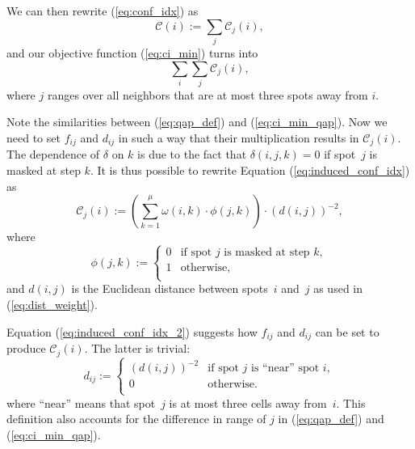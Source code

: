 {We can then rewrite (\ref{eq:conf_idx}) as
\begin{equation}
\mathcal{C}(i) := \sum_{j} \mathcal{C}_{j}(i),
\end{equation}
and our objective function (\ref{eq:ci_min}) turns into
\begin{equation}
\label{eq:ci_min_qap}
\sum_{i} \sum_{j} \mathcal{C}_{j}(i),
\end{equation}
where $j$ ranges over all neighbors that are at most three spots away from $i$.

Note the similarities between (\ref{eq:qap_def}) and (\ref{eq:ci_min_qap}). Now we need to set $f_{ij}$ and $d_{ij}$ in such a way that their multiplication results in $\mathcal{C}_{j}(i)$. The dependence of $\delta$ on $k$ is due to the fact that $\delta(i,j,k) = 0$ if spot~$j$ is masked at step $k$. It is thus possible to rewrite Equation (\ref{eq:induced_conf_idx}) as
\begin{equation}
\label{eq:induced_conf_idx_2}
\mathcal{C}_{j}(i) := \left( \sum_{k=1}^{\mu} \omega(i,k) \cdot \phi(j,k) \right) \cdot (d(i,j))^{-2},
\end{equation}
where
\begin{equation}
\phi(j,k) :=
        \left\{
                \begin{array}{ll}
                        0 & \mbox{if spot $j$ is masked at step $k$}, \\
                        1 & \mbox{otherwise}, \\
                \end{array}
        \right.
\end{equation}
and $d(i,j)$ is the Euclidean distance between spots~$i$ and~$j$ as used in (\ref{eq:dist_weight}).

Equation (\ref{eq:induced_conf_idx_2}) suggests how $f_{ij}$ and $d_{ij}$ can be set to produce $\mathcal{C}_j(i)$. The latter is trivial:
\begin{equation}
d_{ij} :=
        \left\{
                \begin{array}{ll}
                        (d(i,j))^{-2} & \mbox{if spot $j$ is ``near'' spot $i$}, \\
                        0 & \mbox{otherwise}. \\
                \end{array}
        \right.
\end{equation}
where ``near'' means that spot~$j$ is at most three cells away from~$i$. This definition also accounts for the difference in range of $j$ in (\ref{eq:qap_def}) and (\ref{eq:ci_min_qap}).

}
